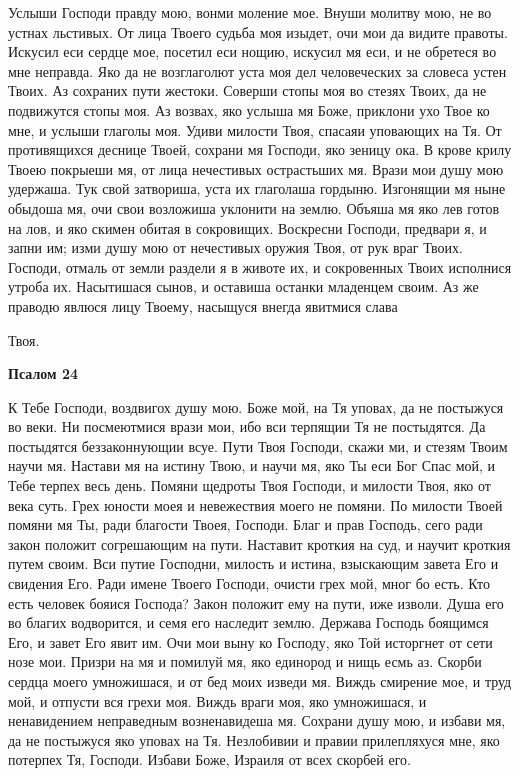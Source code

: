    Услыши Господи правду мою, вонми моление мое. Внуши молитву мою,
не во устнах льстивых. От лица Твоего судьба моя изыдет, очи мои да
видите правоты. Искусил еси сердце мое, посетил еси нощию, искусил мя еси,
и не обретеся во мне неправда. Яко да не возглаголют уста моя дел
человеческих за словеса устен Твоих. Аз сохраних пути жестоки. Соверши
стопы моя во стезях Твоих, да не подвижутся стопы моя. Аз возвах, яко
услыша мя Боже, приклони ухо Твое ко мне, и услыши глаголы моя. Удиви
милости Твоя, спасаяи уповающих на Тя. От противящихся деснице
Твоей, сохрани мя Господи, яко зеницу ока. В крове крилу Твоею
покрыеши мя, от лица нечестивых острастьших мя. Врази мои душу
мою удержаша. Тук свой затвориша, уста их глаголаша гордыню.
Изгонящии мя ныне обыдоша мя, очи свои возложиша уклонити
на землю. Объяша мя яко лев готов на лов, и яко скимен обитая в
сокровищих. Воскресни Господи, предвари я, и запни им; изми душу мою от
нечестивых оружия Твоя, от рук враг Твоих. Господи, отмаль от
земли раздели я в животе их, и сокровенных Твоих исполнися утроба
их. Насытишася сынов, и оставиша останки младенцем своим. Аз
же праводю явлюся лицу Твоему, насыщуся внегда явитмися слава

Твоя.



 

\bfseries Псалом 24\normalfont{}


   К Тебе Господи, воздвигох душу мою. Боже мой, на Тя уповах, да не
постыжуся во веки. Ни посмеютмися врази мои, ибо вси терпящии Тя не
постыдятся. Да постыдятся беззаконнующии всуе. Пути Твоя Господи,
скажи ми, и стезям Твоим научи мя. Настави мя на истину Твою, и научи
мя, яко Ты еси Бог Спас мой, и Тебе терпех весь день. Помяни щедроты
Твоя Господи, и милости Твоя, яко от века суть. Грех юности моея и
невежествия моего не помяни. По милости Твоей помяни мя Ты, ради
благости Твоея, Господи. Благ и прав Господь, сего ради закон положит
согрешающим на пути. Наставит кроткия на суд, и научит кроткия путем
своим. Вси путие Господни, милость и истина, взыскающим завета Его и
свидения Его. Ради имене Твоего Господи, очисти грех мой, мног бо есть.
Кто есть человек бояися Господа? Закон положит ему на пути, иже изволи.
Душа его во благих водворится, и семя его наследит землю. Держава
Господь боящимся Его, и завет Его явит им. Очи мои выну ко Господу, яко
Той исторгнет от сети нозе мои. Призри на мя и помилуй мя, яко
единород и нищь есмь аз. Скорби сердца моего умножишася, и от
бед моих изведи мя. Виждь смирение мое, и труд мой, и отпусти
вся грехи моя. Виждь враги моя, яко умножишася, и ненавидением
неправедным возненавидеша мя. Сохрани душу мою, и избави мя, да не
постыжуся яко уповах на Тя. Незлобивии и правии прилепляхуся мне,
яко потерпех Тя, Господи. Избави Боже, Израиля от всех скорбей
его.



